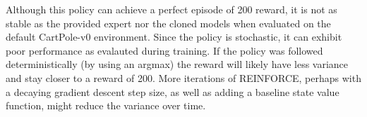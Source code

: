 \documentclass{article}
\begin{document}
Although this policy can achieve a perfect episode of 200 reward, it is not as stable as the provided expert nor the cloned models when evaluated on the default CartPole-v0 environment. Since the policy is stochastic, it can exhibit poor performance as evalauted during training. If the policy was followed deterministically (by using an argmax) the reward will likely have less variance and stay closer to a reward of 200. More iterations of REINFORCE, perhaps with a decaying gradient descent step size, as well as adding a baseline state value function, might reduce the variance over time.


\small
\medskip


\end{document}
